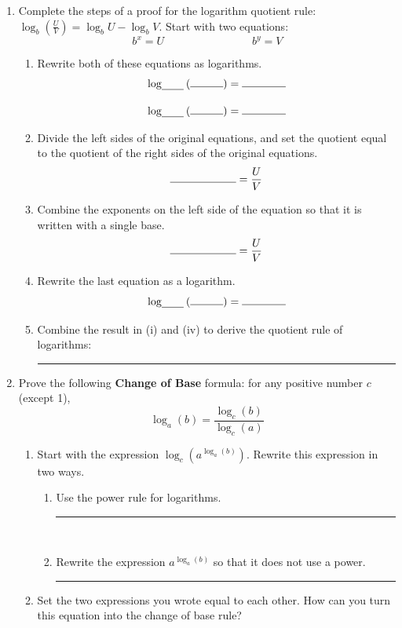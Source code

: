 \documentclass[twoside, 10pt]{article}
\begin{document}
\begin{enumerate}[label=\arabic*.]
\item
Complete the steps of a proof for the logarithm quotient rule: $\displaystyle \log_b\left(\frac{U}{V}\right) = \log_b{U} - \log_b{V}$. Start with two equations:
\[
b^x = U\hspace{8em}b^y = V
\]
\begin{enumerate}
\item
Rewrite both of these equations as logarithms.
\begin{align*}
\log_{\rule{2em}{.4pt}}\left(\rule{3em}{0.4pt}\right) &= \rule{4em}{.4pt}\\[1em]
\log_{\rule{2em}{.4pt}}\left(\rule{3em}{0.4pt}\right) &= \rule{4em}{.4pt}
\end{align*}
\item Divide the left sides of the original equations, and set the quotient equal to the quotient of
the right sides of the original equations.
\[
\rule{6em}{0.4pt} = \frac{U}{V}
\]
\item Combine the exponents on the left side of the equation so that it is written with a
single base.
\[
\rule{6em}{0.4pt} = \frac{U}{V}
\]
\item Rewrite the last equation as a logarithm.
\[
\log_{\rule{2em}{.4pt}}\left(\rule{3em}{0.4pt}\right) = \rule{4em}{.4pt}
\]
\item Combine the result in (i) and (iv) to derive the quotient rule of logarithms:\\[1em]
\begin{center}
\rule{20em}{.4pt}
\end{center}
\end{enumerate}
\item 
Prove the following {\bf Change of Base} formula: for any positive number $c$ (except 1),
\[
\log_a(b) = \frac{\log_c(b)}{\log_c(a)}
\]
\begin{enumerate}
\item
Start with the expression $\displaystyle \log_c(a^{\log_a(b)})$. Rewrite this expression in two ways.\\[1em]
\begin{enumerate}
\item
Use the power rule for logarithms. \rule{20em}{0.4pt}\\[1em]
\item Rewrite the expression $\displaystyle a^{\log_a(b)}$ so that it does not use a power.  \rule{15em}{0.4pt}
\end{enumerate}
\item Set the two expressions you wrote equal to each other. How can you turn this equation
into the change of base rule?\\[1em]


\end{enumerate}
\end{enumerate}
\end{document}
